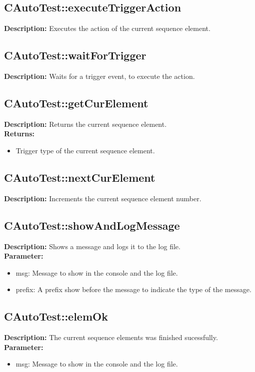 \subsection{CAutoTest::executeTriggerAction}
\textbf{Description:} Executes the action of the current sequence element.\\

\subsection{CAutoTest::waitForTrigger}
\textbf{Description:} Waits for a trigger event, to execute the action.\\

\subsection{CAutoTest::getCurElement}
\textbf{Description:} Returns the current sequence element.\\
\textbf{Returns:}
\begin{itemize}
\item Trigger type of the current sequence element.
\end{itemize}

\subsection{CAutoTest::nextCurElement}
\textbf{Description:} Increments the current sequence element number.\\

\subsection{CAutoTest::showAndLogMessage}
\textbf{Description:} Shows a message and logs it to the log file.\\
\textbf{Parameter:}
\begin{itemize}
\item msg: Message to show in the console and the log file.
\item prefix: A prefix show before the message to indicate the type of the message.
\end{itemize}

\subsection{CAutoTest::elemOk}
\textbf{Description:} The current sequence elements was finished sucessfully.\\
\textbf{Parameter:}
\begin{itemize}
\item msg: Message to show in the console and the log file.
\end{itemize}


